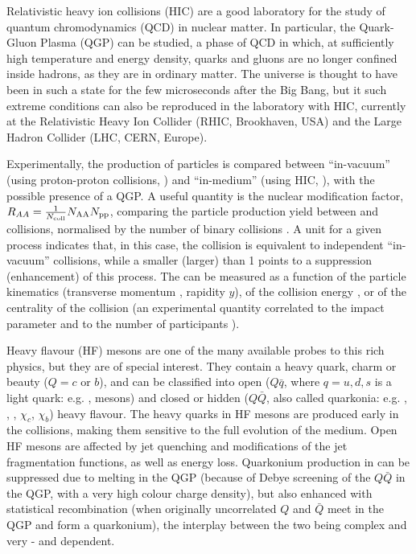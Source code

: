 \documentclass[a4paper,11pt]{article}
\begin{document}
Relativistic heavy ion collisions (HIC) are a good laboratory for the study of quantum chromodynamics (QCD) in nuclear matter. In particular, the Quark-Gluon Plasma (QGP) can be studied, a phase of QCD in which, at sufficiently high temperature and energy density, quarks and gluons are no longer confined inside hadrons, as they are in ordinary matter. The universe is thought to have been in such a state for the few microseconds after the Big Bang, but it such extreme conditions can also be reproduced in the laboratory with HIC, currently at the Relativistic Heavy Ion Collider (RHIC, Brookhaven, USA)
and the Large Hadron Collider (LHC, CERN, Europe).

Experimentally, the production of particles is compared between ``in-vacuum'' (using proton-proton collisions, \pp) and ``in-medium'' (using HIC, \AAA), with the possible presence of a QGP. A useful quantity is the nuclear modification factor, $R_{AA} = \frac{1}{N_{\text{coll}}}{N_{\text{AA}}}{N_{{\text{pp}}}}$, comparing the particle production yield between \pp and \AAA collisions, normalised by the number of binary collisions \ncoll. A unit \raa for a given process indicates that, in this case, the \AAA collision is equivalent to independent ``in-vacuum'' \pp collisions, while a \raa smaller (larger) than 1 points to a suppression (enhancement) of this process. The \raa can be measured as a function of the particle kinematics (transverse momentum \pt, rapidity $y$), of the collision energy \sqrtsnn, or of the centrality of the collision (an experimental quantity correlated to the impact parameter and to the number of participants \npart).

Heavy flavour (HF) mesons are one of the many available probes to this rich physics, but they are of special interest. They contain a heavy quark, charm or beauty ($Q = c$ or $b$), and can be classified into open ($Q\bar{q}$, where $q = u, d, s$ is a light quark: e.g. \D, \B mesons) and closed or hidden ($Q\bar{Q}$, also called quarkonia: e.g. \Jpsi, \psiP,  \PgUabc, $\chi_c$, $\chi_b$) heavy flavour.
The heavy quarks in HF mesons are produced early in the collisions, making them sensitive to the full evolution of the medium. Open HF mesons are affected by jet quenching and modifications of the jet fragmentation functions, as well as energy loss. Quarkonium production in \AAA can be suppressed due to melting in the QGP (because of Debye screening of the $Q\bar{Q}$ in the QGP, with a very high colour charge density), but also enhanced with statistical recombination (when originally uncorrelated $Q$ and $\bar{Q}$ meet in the QGP and form a quarkonium), the interplay between the two being complex and very \pt- and \sqrtsnn dependent.
\end{document}
